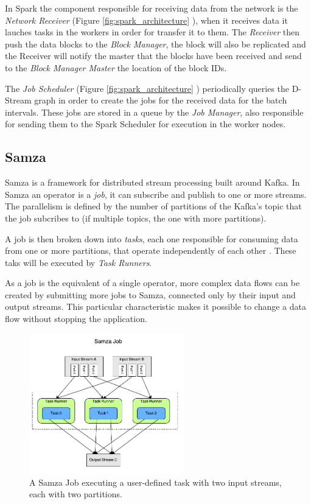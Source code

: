 \documentclass[ppgc,diss,english]{iiufrgs}
\begin{document}
In Spark the component responsible for receiving data from the network is the \emph{Network Receiver} (Figure \ref{fig:spark_architecture} ), when it receives data it lauches tasks in the workers in order for transfer it to them. The \emph{Receiver} then push the data blocks to the \emph{Block Manager}, the block will also be replicated and the Receiver will notify the master that the blocks have been received and send to the \emph{Block Manager Master} the location of the block IDs.

The \emph{Job Scheduler} (Figure \ref{fig:spark_architecture} ) periodically queries the D-Stream graph in order to create the jobs for the received data for the batch intervals. These jobs are stored in a queue by the \emph{Job Manager}, also responsible for sending them to the Spark Scheduler for execution in the worker nodes.


\subsection{Samza}

Samza is a framework for distributed stream processing built around Kafka. In Samza an operator is a \emph{job}, it can subscribe and publish to one or more streams. The parallelism is defined by the number of partitions of the Kafka's topic that the job subcribes to (if multiple topics, the one with more partitions). 

A job is then broken down into \emph{tasks}, each one responsible for consuming data from one or more partitions, that operate independently of each other \cite{ramesh2015samza}. These taks will be executed by \emph{Task Runners}.

As a job is the equivalent of a single operator, more complex data flows can be created by submitting more jobs to Samza, connected only by their input and output streams. This particular characteristic makes it possible to change a data flow without stopping the application.

\begin{figure}[!ht]
	\centering
	\includegraphics[width=0.6\textwidth]{images/samza/job_2.pdf}
	\caption[A Samza Job executing a user-defined task]{A Samza Job executing a user-defined task with two input streams, each with two partitions.}
	\label{fig:samza_job_execution}
\end{figure}
\end{document}
